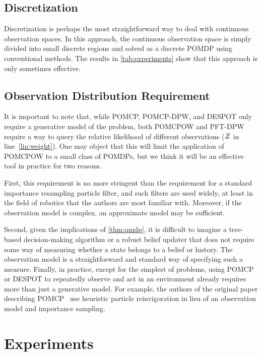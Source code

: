 \subsection{Discretization} \label{sec:discretization}

Discretization is perhaps the most straightforward way to deal with continuous observation spaces.
In this approach, the continuous observation space is simply divided into small discrete regions and solved as a discrete POMDP using conventional methods.
The results in \cref{tab:experiments} show that this approach is only sometimes effective.

\subsection{Observation Distribution Requirement}

It is important to note that, while POMCP, POMCP-DPW, and DESPOT only require a generative model of the problem,  both POMCPOW and PFT-DPW require a way to query the relative likelihood of different observations ($\mathcal{Z}$ in line~\ref{lin:weight}).
One may object that this will limit the application of POMCPOW to a small class of POMDPs, but we think it will be an effective tool in practice for two reasons.

First, this requirement is no more stringent than the requirement for a standard importance resampling particle filter, and such filters are used widely, at least in the field of robotics that the authors are most familiar with. 
Moreover, if the observation model is complex, an approximate model may be sufficient.

Second, given the implications of \cref{thm:qmdp}, it is difficult to imagine a tree-based decision-making algorithm or a robust belief updater that does not require some way of measuring whether a state belongs to a belief or history.
The observation model is a straightforward and standard way of specifying such a measure.
Finally, in practice, except for the simplest of problems, using POMCP or DESPOT to repeatedly observe and act in an environment already requires more than just a generative model.
For example, the authors of the original paper describing POMCP~\cite{silver2010pomcp} use heuristic particle reinvigoration in lieu of an observation model and importance sampling.

\section{Experiments} \label{sec:experiments}

